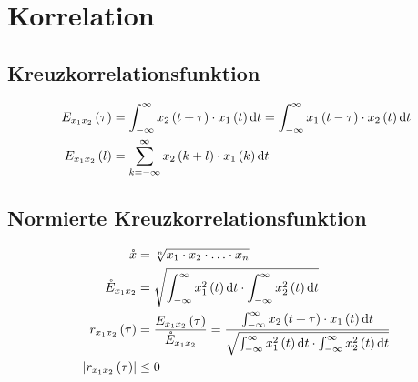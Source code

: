 \section*{Korrelation}
\subsection*{Kreuzkorrelationsfunktion}
\begin{align*}
E_{x_1x_2}\left(\tau\right) &=\int_{-\infty}^\infty x_2\left(t+\tau\right)\cdot
x_1\left(t\right)\mathop{}\!\mathrm{d} t=\int_{-\infty}^\infty x_1\left(t-\tau\right)\cdot x_2\left(t\right)\mathop{}\!\mathrm{d} t\\
E_{x_1x_2}\left(l\right) &=\sum_{k=-\infty}^\infty x_2\left(k+l\right)\cdot x_1\left(k\right)\mathop{}\!\mathrm{d} t
\end{align*}

\subsection*{Normierte Kreuzkorrelationsfunktion}
\begin{align*}
\mathring{x} &=\sqrt[n]{x_1\cdot x_2\cdot \dotsc \cdot x_n}\\
\mathring{E}_{x_1x_2} &=\sqrt{\int_{-\infty}^\infty x_1^2\left(t\right)\mathop{}\!\mathrm{d} t\cdot
\int_{-\infty}^\infty x_2^2\left(t\right)\mathop{}\!\mathrm{d} t}\\
r_{x_1x_2}\left(\tau\right)
&=\frac{E_{x_1x_2}\left(\tau\right)}{\mathring{E}_{x_1x_2}}=\frac{\int_{-\infty}^\infty x_2\left(t+\tau\right)\cdot x_1\left(t\right)\mathop{}\!\mathrm{d} t}{\sqrt{\int_{-\infty}^\infty x_1^2\left(t\right)\mathop{}\!\mathrm{d} t\cdot \int_{-\infty}^\infty x_2^2\left(t\right)\mathop{}\!\mathrm{d} t}}\\
\left|r_{x_1x_2}\left(\tau\right)\right| &\leq 0
\end{align*}